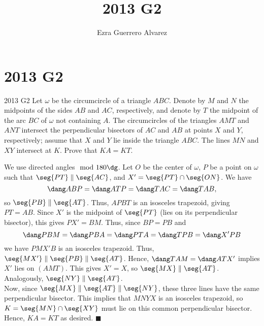 \documentclass[14pt]{article}
\title{2013 G2}
\author{Ezra Guerrero Alvarez}
\begin{document}
\maketitle
	
\section*{2013 G2}

\begin{statement}{2013 G2}
	Let $\omega$ be the circumcircle of a triangle $ABC$.
	Denote by $M$ and $N$ the midpoints of the sides $AB$ and $AC$,
	respectively, and denote by $T$ the midpoint
	of the arc $BC$ of $\omega$ not containing $A$.
	The circumcircles of the triangles $AMT$ and $ANT$
	intersect the perpendicular bisectors of $AC$ and $AB$ at points $X$ and $Y$,
	respectively; assume that $X$ and $Y$ lie inside the triangle $ABC$.
	The lines $MN$ and $XY$ intersect at $K$.
	Prove that $KA=KT$.
\end{statement}
We use directed angles$\mod180\dg$. Let $O$ be the center of $\omega$, $P$ be a point on $\omega$ such that $\seg{PT}\parallel\seg{AC}$, and $X'=\seg{PT}\cap\seg{ON}$. We have 
\[\dang ABP = \dang ATP = \dang TAC = \dang TAB, \]
so $\seg{PB}\parallel\seg{AT}$. Thus, $APBT$ is an isosceles trapezoid, giving $PT=AB$. Since $X'$ is the midpoint of $\seg{PT}$ (lies on its perpendicular bisector), this gives $PX'=BM$. Thus, since $BP=PB$ and 
\[\dang PBM=\dang PBA=\dang PTA=\dang TPB = \dang X'PB\] 
we have $PMX'B$ is an isosceles trapezoid. Thus, $\seg{MX'}\parallel\seg{PB}\parallel\seg{AT}$. Hence, $\dang TAM = \dang ATX'$ implies $X'$ lies on $(AMT)$. This gives $X'=X$, so $\seg{MX}\parallel\seg{AT}$. Analogously, $\seg{NY}\parallel\seg{AT}$.\\
Now, since $\seg{MX}\parallel\seg{AT}\parallel\seg{NY}$, these three lines have the same perpendicular bisector. This implies that $MNYX$ is an isosceles trapezoid, so $K=\seg{MN}\cap\seg{XY}$ must lie on this common perpendicular bisector. Hence, $KA=KT$ as desired. $\blacksquare$
	
\end{document}
